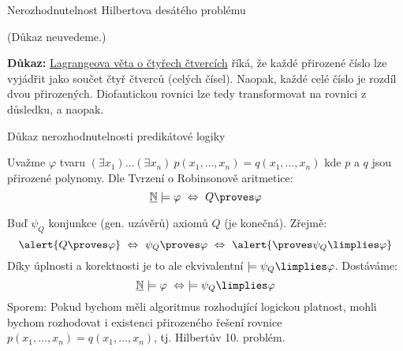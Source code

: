 \documentclass{beamer}
\begin{document}
\begin{frame}{Nerozhodnutelnost Hilbertova desátého problému}

    \pause

    (Důkaz neuvedeme.)

    \medskip

    \pause
    
    \pause
    \textbf{Důkaz:} \alert{\href{https://en.wikipedia.org/wiki/Lagrange\%27s_four-square_theorem}{Lagrangeova věta o čtyřech čtvercích}} říká, že každé přirozené číslo lze vyjádřit jako součet čtyř čtverců (celých čísel). Naopak, každé celé číslo je rozdíl dvou přirozených. Diofantickou rovnici lze tedy transformovat na rovnici z důsledku, a naopak.\hfill\qedsymbol

\end{frame}


\begin{frame}{Důkaz nerozhodnutelnosti predikátové logiky}

    \pause
    Uvažme $\varphi$ tvaru $(\exists x_1)\dots(\exists x_n)\ p(x_1,\dots,x_n)=q(x_1,\dots,x_n)$ 
    kde $p$ a $q$ jsou přirozené polynomy. Dle Tvrzení o Robinsonově aritmetice:
    $$
    \underline{\mathbb N}\models \varphi\ \Leftrightarrow\  Q\proves \varphi
    $$

    \pause
    Buď $\psi_Q$ konjunkce (gen. uzávěrů) axiomů $Q$ (je konečná). Zřejmě: 
    $$
    \alert{Q\proves\varphi}\ \Leftrightarrow\ \psi_Q\proves\varphi\ \Leftrightarrow\ \alert{\proves\psi_Q\limplies\varphi}
    $$
    \pause
    Díky úplnosti a korektnosti je to ale ekvivalentní \alert{$\models\psi_Q\limplies\varphi$}. Dostáváme:
    $$
    \underline{\mathbb N}\models \varphi\ \Leftrightarrow\ \models \psi_Q\limplies\varphi
    $$
    \pause
    \alert{Sporem:} Pokud bychom měli algoritmus rozhodující logickou platnost, mohli bychom rozhodovat i existenci přirozeného řešení rovnice $p(x_1,\dots,x_n)=q(x_1,\dots,x_n)$, tj. Hilbertův 10. problém.\hfill\qedsymbol

\end{frame}
\end{document}
